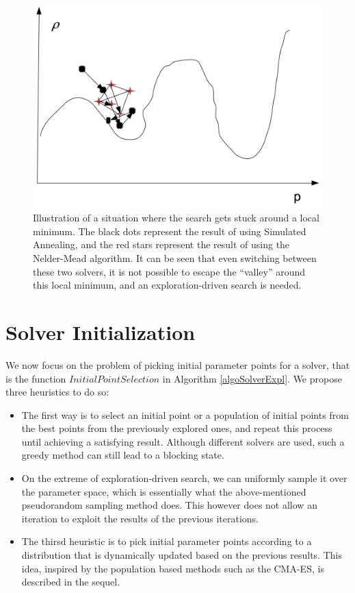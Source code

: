\begin{figure}
\includegraphics[scale=0.3]{LocalOptimum.png}
\caption{Illustration of a situation where the search gets stuck around a local minimum. The black dots represent the result of using Simulated Annealing, and the red stars represent the result of using the Nelder-Mead algorithm. It can be seen that even switching between these two solvers, it is not possible to escape the ``valley'' around this local minimum, and an exploration-driven search is needed.} 
\end{figure}

\section{Solver Initialization}\label{sec:init}

We now focus on the problem of picking initial parameter points for a solver, that is the function $InitialPointSelection$ in Algorithm \ref{algoSolverExpl}. We propose three heuristics to do so:
\begin{itemize}
\item The first way is to select an initial point or a population of initial points from the best points from the previously explored ones, and repeat this process until achieving a satisfying result. Although different solvers are used, such a greedy method can still lead to a blocking state. 
\item On the extreme of exploration-driven search, we can uniformly sample it over the parameter space, which is essentially what the above-mentioned pseudorandom sampling method does. This however does not allow an iteration to exploit the results of the previous iterations. 
\item The thirsd heuristic is to pick initial parameter points according to a distribution that is dynamically updated based on the previous results. This idea, inspired by the population based methods such as the CMA-ES, is described in the sequel. 
\end{itemize}

